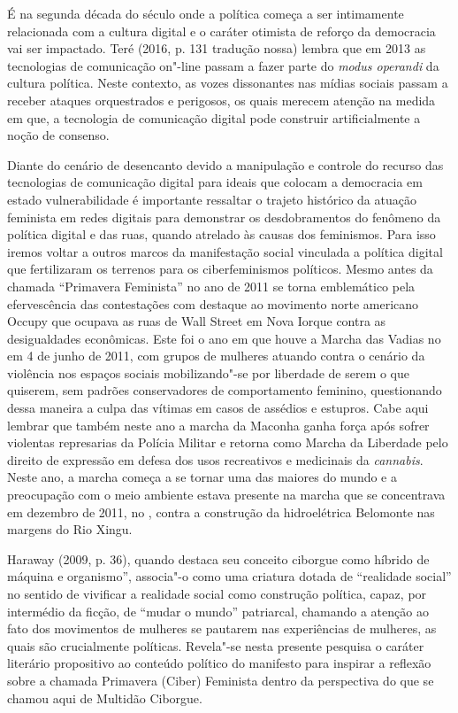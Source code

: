 É na segunda década do século  onde a política começa a ser
intimamente relacionada com a cultura digital e o caráter otimista de
reforço da democracia vai ser impactado. Teré (2016, p. 131 tradução
nossa) lembra que em 2013 as tecnologias de comunicação on"-line passam a
fazer parte do \emph{modus operandi} da cultura política. Neste
contexto, as vozes dissonantes nas mídias sociais passam a receber
ataques orquestrados e perigosos, os quais merecem atenção na medida em
que, a tecnologia de comunicação digital pode construir artificialmente
a noção de consenso.

Diante do cenário de desencanto devido a manipulação e controle do
recurso das tecnologias de comunicação digital para ideais que colocam a
democracia em estado vulnerabilidade é importante ressaltar o trajeto
histórico da atuação feminista em redes digitais para demonstrar os
desdobramentos do fenômeno da política digital e das ruas, quando
atrelado às causas dos feminismos. Para isso iremos voltar a outros
marcos da manifestação social vinculada a política digital que
fertilizaram os terrenos para os ciberfeminismos políticos. Mesmo antes
da chamada ``Primavera Feminista'' no ano de 2011 se torna emblemático
pela efervescência das contestações com destaque ao movimento norte
americano Occupy que ocupava as ruas de Wall Street em Nova Iorque
contra as desigualdades econômicas. Este foi o ano em que houve a Marcha
das Vadias no em 4 de junho de 2011, com grupos de mulheres atuando
contra o cenário da violência nos espaços sociais mobilizando"-se por
liberdade de serem o que quiserem, sem padrões conservadores de
comportamento feminino, questionando dessa maneira a culpa das vítimas
em casos de assédios e estupros. Cabe aqui lembrar que também neste ano
a marcha da Maconha ganha força após sofrer violentas represarias da
Polícia Militar e retorna como Marcha da Liberdade pelo direito de
expressão em defesa dos usos recreativos e medicinais da
\emph{cannabis}. Neste ano, a marcha  começa a se tornar uma das
maiores do mundo e a preocupação com o meio ambiente estava presente na
marcha que se concentrava em dezembro de 2011, no , contra a
construção da hidroelétrica Belomonte nas margens do Rio Xingu.

Haraway (2009, p. 36), quando destaca seu conceito ciborgue como híbrido
de máquina e organismo'', associa"-o como uma criatura dotada de
``realidade social'' no sentido de vivificar a realidade social como
construção política, capaz, por intermédio da ficção, de ``mudar o
mundo'' patriarcal, chamando a atenção ao fato dos movimentos de
mulheres se pautarem nas experiências de mulheres, as quais são
crucialmente políticas. Revela"-se nesta presente pesquisa o caráter
literário propositivo ao conteúdo político do manifesto para inspirar a
reflexão sobre a chamada Primavera (Ciber) Feminista dentro da
perspectiva do que se chamou aqui de Multidão Ciborgue.

